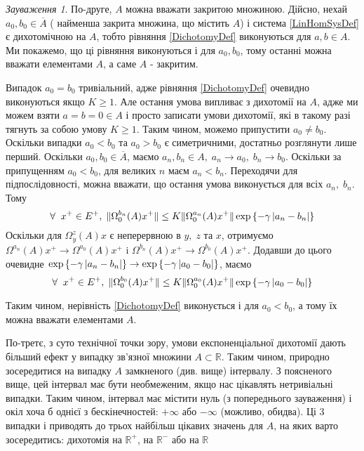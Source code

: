 \documentclass[14pt]{extarticle} %
\let\oldforall\forall
\renewcommand{\forall}{\oldforall\;}
\theoremstyle{remark}
\newtheorem{remark}{Зауваження}
\begin{document}
\begin{remark}
	По-друге, $A$ можна вважати закритою множиною. Дійсно, нехай $a_0,b_0\in\overline{A}$ (
	найменша закрита множина, що містить $A$) і система \ref{LinHomSysDef} є дихотомічною на $A$,
	тобто рівняння \ref{DichotomyDef} виконуються для $a,b\in A$. Ми покажемо, що ці рівняння виконуються і для $a_0,b_0$, тому останні можна
	вважати елементами $A$, а саме $A$ - закритим.

	Випадок $a_0=b_0$ тривіальний, адже рівняння \ref{DichotomyDef} очевидно виконуються якщо $K\geq 1$. Але остання умова випливає з дихотомії
	на $A$, адже ми можем взяти $a=b=0\in A$ і просто записати умови дихотомії, які в такому разі тягнуть за собою умову $K\geq 1$. Таким чином,
	можемо припустити $a_0\neq b_0$. Оскільки випадки $a_0<b_0$ та $a_0>b_0$ є симетричними, достатньо розглянути лише перший. Оскільки $a_0,
	b_0\in\overline{A}$, маємо $a_n,b_n\in A,\; a_n\to a_0,\;b_n\to b_0$. Оскільки за припущенням $a_0<b_0$, для великих $n$ маєм
	$a_n<b_n$. Переходячи для підпослідовності, можна вважати, що остання умова виконується для всіх $a_n,\;b_n$. Тому
	\[\forall x^+\in E^+,\;\mynorm{\Omega^{b_n}_0(A)x^+}\leq K\mynorm{\Omega_0^{a_n}(A)x^+}\exp\left\{-\gamma\myabs{a_n-b_n}\right\}\]
	Оскільки для $\Omega_y^z(A)x$ є неперервною в $y,\;z$ та $x$, отримуємо $\Omega^{a_n}(A)x^+\to\Omega^{a_0}(A)x^+$ i
	$\Omega^{b_n}(A)x^+\to\Omega^{b_0}(A)x^+$. Додавши до цього очевидне $\exp\left\{-\gamma\left|a_n-b_n\right|\right\}\to
	\exp\left\{-\gamma\left|a_0-b_0\right|\right\}$, маємо
	\[\forall x^+\in E^+,\;\mynorm{\Omega^{b_0}_0(A)x^+}\leq K\mynorm{\Omega_0^{a_0}(A)x^+}\exp\left\{-\gamma\myabs{a_0-b_0}\right\}\]

	Таким чином, нерівність \ref{DichotomyDef} виконується і для $a_0< b_0$, а тому їх можна вважати елементами $A$.

	По-третє, з суто технічної точки зору, умови експоненціальної дихотомії дають більший ефект у випадку зв’язної множини $A\subset\mathbb{R}$.
	Таким чином, природно зосередитися на випадку $A$ замкненого (див. вище) інтервалу. З поясненого вище, цей інтервал має бути необмеженим,
	якщо нас цікавлять нетривіальні випадки. Таким чином, інтервал має містити нуль (з попереднього зауваження) і окіл хоча б однієї
	з бескінечностей: $+\infty$ або $-\infty$ (можливо, обидва). Ці 3 випадки і приводять до трьох найбільш цікавих значень для $A$, на
	яких варто зосередитись: дихотомія на $\mathbb{R}^+$, на $\mathbb{R}^-$ або на $\mathbb{R}$
\end{remark}
\end{document}
